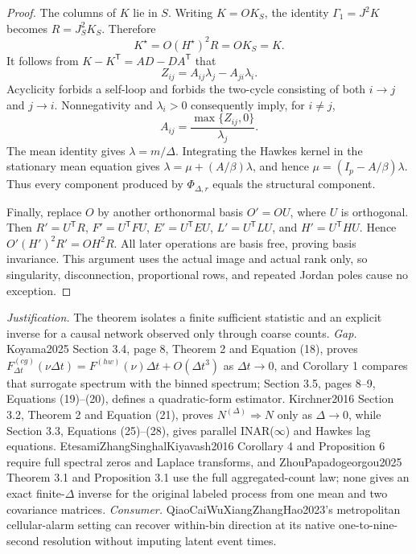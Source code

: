 \documentclass{article}
\begin{document}
\begin{proof}
The columns of \(K\) lie in \(S\).  Writing \(K=OK_S\), the identity \(\Gamma_1=J^2K\) becomes \(R=J_S^2K_S\).  Therefore
\[
 K^\star=O(H^\star)^2R=OK_S=K.
\]
It follows from \(K-K^{\mathsf T}=AD-DA^{\mathsf T}\) that
\[
 Z_{ij}=A_{ij}\lambda_j-A_{ji}\lambda_i.
\]
Acyclicity forbids a self-loop and forbids the two-cycle consisting of both \(i\to j\) and \(j\to i\).  Nonnegativity and \(\lambda_i>0\) consequently imply, for \(i\neq j\),
\[
 A_{ij}=\frac{\max\{Z_{ij},0\}}{\lambda_j}.
\]
The mean identity gives \(\lambda=m/\Delta\).  Integrating the Hawkes kernel in the stationary mean equation gives \(\lambda=\mu+(A/\beta)\lambda\), and hence \(\mu=(I_p-A/\beta)\lambda\).  Thus every component produced by \(\Phi_{\Delta,r}\) equals the structural component.

Finally, replace \(O\) by another orthonormal basis \(O'=OU\), where \(U\) is orthogonal.  Then \(R'=U^{\mathsf T}R\), \(F'=U^{\mathsf T}FU\), \(E'=U^{\mathsf T}EU\), \(L'=U^{\mathsf T}LU\), and \(H'=U^{\mathsf T}HU\).  Hence \(O'(H')^2R'=OH^2R\).  All later operations are basis free, proving basis invariance.  This argument uses the actual image and actual rank only, so singularity, disconnection, proportional rows, and repeated Jordan poles cause no exception.
\end{proof}
\par\smallskip\noindent \textit{Justification.} The theorem isolates a finite sufficient statistic and an explicit inverse for a causal network observed only through coarse counts. \textit{Gap.} Koyama2025 Section 3.4, page 8, Theorem 2 and Equation (18), proves \(F_{\Delta t}^{(cg)}(\nu\Delta t)=F^{(hw)}(\nu)\Delta t+O(\Delta t^3)\) as \(\Delta t\to0\), and Corollary 1 compares that surrogate spectrum with the binned spectrum; Section 3.5, pages 8--9, Equations (19)--(20), defines a quadratic-form estimator. Kirchner2016 Section 3.2, Theorem 2 and Equation (21), proves \(N^{(\Delta)}\Rightarrow N\) only as \(\Delta\to0\), while Section 3.3, Equations (25)--(28), gives parallel INAR(\(\infty\)) and Hawkes lag equations. EtesamiZhangSinghalKiyavash2016 Corollary 4 and Proposition 6 require full spectral zeros and Laplace transforms, and ZhouPapadogeorgou2025 Theorem 3.1 and Proposition 3.1 use the full aggregated-count law; none gives an exact finite-\(\Delta\) inverse for the original labeled process from one mean and two covariance matrices. \textit{Consumer.} QiaoCaiWuXiangZhangHao2023's metropolitan cellular-alarm setting can recover within-bin direction at its native one-to-nine-second resolution without imputing latent event times.
\end{document}
